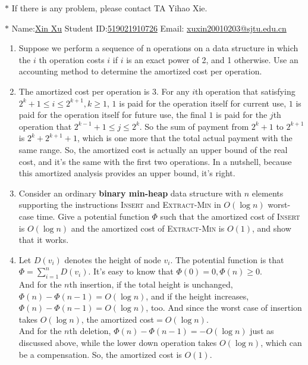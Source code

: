 \documentclass[12pt,a4paper]{article}
\makeatletter
\newtheorem*{solution}{Solution}
\theoremstyle{definition}
\renewenvironment{solution}[1][Solution] {\par\pushQED{\qed}\normalfont\topsep6\p@\@plus6\p@\relax\trivlist\item[\hskip\labelsep\bfseries#1\@addpunct{.}]\ignorespaces}{\popQED\endtrivlist\@endpefalse} \makeatother
\makeatother
\begin{document}
\noindent

\noindent{}
\begin{center}
\footnotesize{\color{red}$*$ If there is any problem, please contact TA Yihao Xie. }

\footnotesize{\color{blue}$*$ Name:\underline{Xin Xu}  \quad Student ID:\underline{519021910726} \quad Email: \underline{xuxin20010203@sjtu.edu.cn}}
\end{center}
\begin{enumerate}
	\item Suppose we perform a sequence of n operations on a data structure in which the $i$ th 		operation costs $i$ if $i$ is an exact power of 2, and 1 otherwise. Use an accounting method to determine the amortized cost per operation.
	
	\begin{solution}
		The amortized cost per operation is $3$. For any $i$th operation that satisfying $2^k+1\leqslant i\leqslant 2^{k+1},k\geqslant 1$, $1$ is paid for the operation itself for current use, $1$ is paid for the operation itself for future use, the final $1$ is paid for the $j$th operation that $2^{k-1}+1\leqslant j\leqslant 2^k$. So the sum of payment from $2^k+1$ to $2^{k+1}$ is $2^k+2^{k+1}+1$, which is one more that the total actual payment with the same range.
		So, the amortized cost is actually an upper bound of the real cost, and it's the same with the first two operations. In a nutshell, because this amortized analysis provides an upper bound, it's right.
	\end{solution} 

	\item Consider an ordinary \textbf{binary min-heap} data structure with $n$ elements supporting
the instructions \textsc{Insert} and \textsc{Extract-Min} in $O(\log n)$ worst-case time. Give a
potential function $\Phi$ such that the amortized cost of \textsc{Insert} is $O(\log n)$ and the
amortized cost of \textsc{Extract-Min} is $O(1)$, and show that it works.

    \begin{solution}
		Let $D(v_i)$ denotes the height of node $v_i$. The potential function is that $\Phi=\sum_{i = 1}^{n} D(v_i) $. It's easy to know that $\Phi(0)=0, \Phi(n)\geqslant 0$.
		\\ And for the $n$th insertion, if the total height is unchanged, $\Phi(n)-\Phi(n-1)=O(\log n)$, and if the height increases, $\Phi(n)-\Phi(n-1)=O(\log n)$, too. And since the worst case of insertion takes $O(\log n)$, the amortized cost$=O(\log n)$.
		\\ And for the $n$th deletion, $\Phi(n)-\Phi(n-1)=-O(\log n)$ just as discussed above, while the lower down operation takes $O(\log n)$, which can be a compensation. So, the amortized cost is $O(1)$.
	\end{solution}
	

\end{enumerate}
\end{document}
